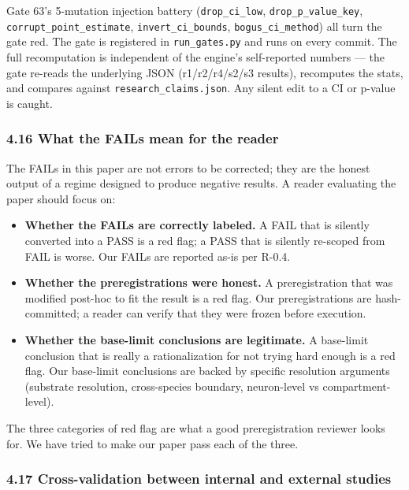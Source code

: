 \documentclass[
]{article}
\providecommand{\tightlist}{%
  \setlength{\itemsep}{0pt}\setlength{\parskip}{0pt}}
\begin{document}
Gate 63's 5-mutation injection battery (\texttt{drop\_ci\_low},
\texttt{drop\_p\_value\_key}, \texttt{corrupt\_point\_estimate},
\texttt{invert\_ci\_bounds}, \texttt{bogus\_ci\_method}) all turn the
gate red. The gate is registered in \texttt{run\_gates.py} and runs on
every commit. The full recomputation is independent of the engine's
self-reported numbers --- the gate re-reads the underlying JSON
(r1/r2/r4/s2/s3 results), recomputes the stats, and compares against
\texttt{research\_claims.json}. Any silent edit to a CI or p-value is
caught.

\subsubsection{4.16 What the FAILs mean for the
reader}\label{what-the-fails-mean-for-the-reader}

The FAILs in this paper are not errors to be corrected; they are the
honest output of a regime designed to produce negative results. A reader
evaluating the paper should focus on:

\begin{itemize}
\tightlist
\item
  \textbf{Whether the FAILs are correctly labeled.} A FAIL that is
  silently converted into a PASS is a red flag; a PASS that is silently
  re-scoped from FAIL is worse. Our FAILs are reported as-is per R-0.4.
\item
  \textbf{Whether the preregistrations were honest.} A preregistration
  that was modified post-hoc to fit the result is a red flag. Our
  preregistrations are hash-committed; a reader can verify that they
  were frozen before execution.
\item
  \textbf{Whether the base-limit conclusions are legitimate.} A
  base-limit conclusion that is really a rationalization for not trying
  hard enough is a red flag. Our base-limit conclusions are backed by
  specific resolution arguments (substrate resolution, cross-species
  boundary, neuron-level vs compartment-level).
\end{itemize}

The three categories of red flag are what a good preregistration
reviewer looks for. We have tried to make our paper pass each of the
three.

\subsubsection{4.17 Cross-validation between internal and external
studies}\label{cross-validation-between-internal-and-external-studies}
\end{document}
